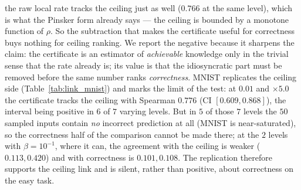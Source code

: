 \documentclass[11pt]{article}
\begin{document}
the raw local rate tracks the ceiling just as well ($0.766$ at the same level),
which is what the Pinsker form already says --- the ceiling is bounded by a monotone function of
$\rho$. So the subtraction that makes the certificate useful for correctness buys nothing for
ceiling ranking. We report the negative because it sharpens the claim: the certificate is an
estimator of \emph{achievable} knowledge only in the trivial sense that the rate already is; its
value is that the idiosyncratic part must be removed before the same number ranks
\emph{correctness}. MNIST replicates the ceiling side (Table~\ref{tab:link_mnist}) and marks the limit of the test: at $0.01$ and $\times5.0$ the certificate tracks the ceiling with Spearman $0.776$ (CI $[0.609, 0.868]$), the interval being positive in $6$ of $7$ varying levels. But in $5$ of those $7$ levels the $50$ sampled inputs contain \emph{no} incorrect prediction at all (MNIST is near-saturated), so the correctness half of the comparison cannot be made there; at the $2$ levels with $\beta=10^{-1}$, where it can, the agreement with the ceiling is weaker ($0.113, 0.420$) and with correctness is $0.101, 0.108$. The replication therefore supports the ceiling link and is silent, rather than positive, about correctness on the easy task.   

\begin{table}[t]\centering\footnotesize
\setlength{\tabcolsep}{3.5pt}
\caption{Certificate $c(x)$ versus the exact LP ceiling $\mathrm{ceil}(x)$ on a discretised
FashionMNIST code ($\beta=10^{-2}$, $50$ inputs per level). ``sd'' is the spread of the ceiling:
where it is $0$ the ceiling is constant (all inputs can, or cannot, be required to be known) and a
rank correlation is meaningless, so those rows report n/a.}
\label{tab:link}

\end{table}

\begin{table}[t]\centering\footnotesize
\setlength{\tabcolsep}{3.5pt}
\caption{The same certificate-versus-ceiling comparison on a MNIST code, $50$ inputs per level.
The $n/a$ entries in the $c\!\sim\!\mathrm{correct}$ column at the levels where the ceiling varies are
the point of the replication: every sampled input is correctly classified there, so there is no
incorrect prediction to rank and the correctness half of the comparison is not testable.}
\label{tab:link_mnist}

\end{table}
\end{document}
